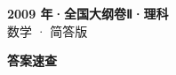 \documentclass[zihao=-4, a4paper]{ctexart}
\begin{document}
\begin{center}
  {\Large\bfseries 2009 年·全国大纲卷Ⅱ·理科}\\[4pt]
  {\large 数学 · 简答版}
\end{center}
\medskip
{}

\clearpage
{}
\begin{center}{\Large\bfseries 答案速查}\end{center}
\medskip

\end{document}
